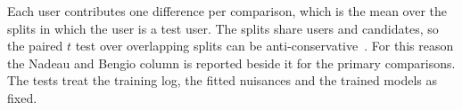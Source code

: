 Each user contributes one difference per comparison, which is the mean over the splits in which the user is a
test user. The splits share users and candidates, so the paired $t$ test over overlapping splits can be
anti-conservative~\citep{nadeau2003}. For this reason the Nadeau and Bengio column is reported beside it for the
primary comparisons. The tests treat the training log, the fitted nuisances and the trained models as fixed.
